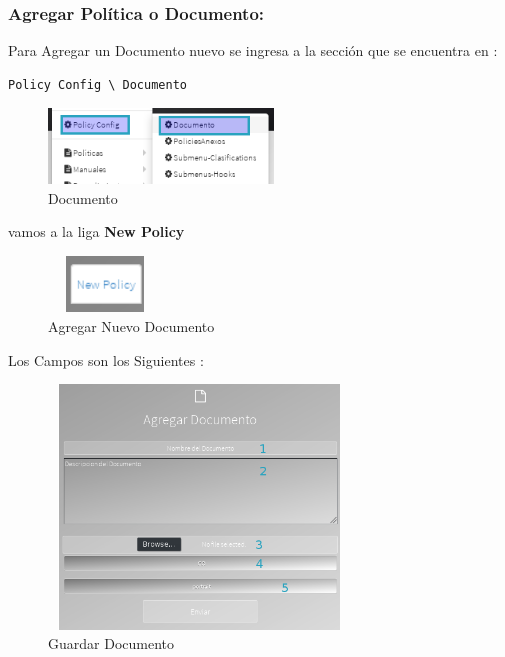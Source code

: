 \documentclass[12pt,letterpaper]{article}
\begin{document}
	\begin{subsection}{\color{blackgreen}}
	\sffamily
	{

      \subsubsection{Agregar Pol\'itica o Documento:}

      Para Agregar un Documento nuevo se ingresa a la secci\'on que se encuentra en :

      \begin{lstlisting}[caption=Ruta Documento,style=customc]
        Policy Config \ Documento
      \end{lstlisting}

        \begin{figure}[htb]
          \centering
          \includegraphics[angle=0,width=60mm,height=20mm]{img/Menu_054.png}
          \caption{Documento}
          \label{menu54}
        \end{figure}

      vamos a la liga \textbf{New Policy}
        \begin{figure}[htb]
          \centering
          \includegraphics[angle=0,width=30mm,height=15mm]{img/Selection_055.png}
          \caption{Agregar Nuevo Documento}
          \label{sel55}
        \end{figure}
\newpage
      Los Campos son los Siguientes :

        \begin{figure}[htb]
          \centering
          \includegraphics[angle=0,width=80mm,height=65mm]{img/Selection_056.png}
          \caption{Guardar Documento}
          \label{sel56}
        \end{figure}

}
\end{subsection}
\end{document}
